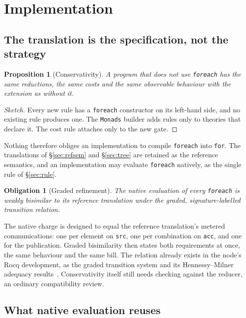 \documentclass[11pt]{article}
\theoremstyle{branddef}
\newtheorem{obligation}[definition]{Obligation}
\theoremstyle{brandplain}
\newtheorem{proposition}[definition]{Proposition}
\theoremstyle{brandrem}
\newcommand{\fe}{\texttt{foreach}}
\begin{document}
\section{Implementation}
\label{sec:impl}

\subsection{The translation is the specification, not the strategy}

\begin{proposition}[Conservativity]
\label{prop:conservative}
A program that does not use \fe{} has the same reductions, the same costs and
the same observable behaviour with the extension as without it.
\end{proposition}

\begin{proof}[Sketch]
Every new rule has a \fe{} constructor on its left-hand side, and no existing
rule produces one. The \texttt{Monads} builder adds rules only to theories that
declare it. The cost rule attaches only to the new gate.
\end{proof}

Nothing therefore obliges an implementation to compile \fe{} into
\texttt{for}. The translations of \S\ref{sec:refsem} and \S\ref{sec:tree} are
retained as the reference semantics, and an implementation may evaluate \fe{}
natively, as the single rule of \S\ref{sec:rule}.

\begin{obligation}[Graded refinement]
\label{obl:graded}
The native evaluation of every \fe{} is weakly bisimilar to its reference
translation under the graded, signature-labelled transition relation.
\end{obligation}

The native charge is designed to equal the reference translation's metered
communications: one per element on \texttt{src}, one per combination on
\texttt{acc}, and one for the publication. Graded bisimilarity then states both
requirements at once, the same behaviour and the same bill. The relation
already exists in the node's Rocq development, as the graded transition system
and its Hennessy--Milner adequacy results~\cite{f1r3nodeOTE}. Conservativity
itself still needs checking against the reducer, an ordinary compatibility
review.

\subsection{What native evaluation reuses}
\end{document}
